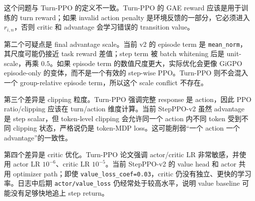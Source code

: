 \documentclass[10pt]{ctexart}
\newcommand{\code}[1]{\texttt{#1}}
\begin{document}
这个问题与 Turn-PPO 的定义不一致。Turn-PPO 的 GAE reward 应该是用于训练的 turn reward；如果 invalid action penalty 是环境反馈的一部分，它必须进入 $r_{i,n}$，否则 critic 和 advantage 会学习错误的 transition value。

第二个可疑点是 final advantage scale。当前 v2 的 episode term 是 \code{mean\_norm}，其尺度可能仍接近 task reward 差值；step term 被 batch whitening 后是 unit-scale，再乘 $0.5$。如果 episode term 的数值尺度更大，实际优化会更像 GiGPO episode-only 的变体，而不是一个有效的 step-wise PPO。Turn-PPO 则不会混入一个 group-relative episode term，所以这个 scale conflict 不存在。

第三个差异是 clipping 粒度。Turn-PPO 强调完整 response 是 action，因此 PPO ratio/clipping 应该在 turn/action 维度计算。当前 StepPPO-v2 虽然 advantage 是 step scalar，但 token-level clipping 会允许同一个 action 内不同 token 受到不同 clipping 状态，严格说仍是 token-MDP loss。这可能削弱“一个 action 一个 advantage”的一致性。

第四个差异是 critic 优化。Turn-PPO 论文强调 actor/critic LR 非常敏感，并使用 actor LR $10^{-6}$、critic LR $10^{-5}$。当前 StepPPO-v2 的 value head 和 actor 共用 optimizer path；即使 \code{value\_loss\_coef=0.03}，critic 仍没有独立、更快的学习率。日志中后期 \code{actor/value\_loss} 仍经常处于较高水平，说明 value baseline 可能没有足够快地追上 step return。
\end{document}
